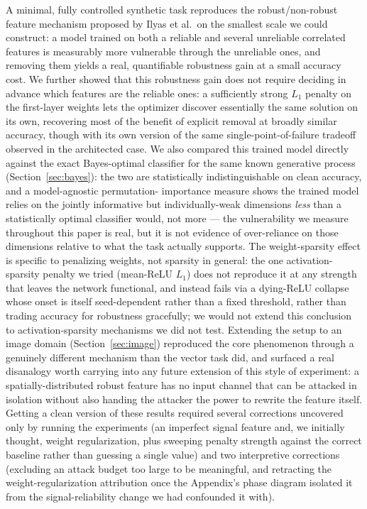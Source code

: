 \documentclass[11pt]{article}
\begin{document}
A minimal, fully controlled synthetic task reproduces the robust/non-robust
feature mechanism proposed by Ilyas et al.\ on the smallest scale we could
construct: a model trained on both a reliable and several unreliable
correlated features is measurably more vulnerable through the unreliable
ones, and removing them yields a real, quantifiable robustness gain at a
small accuracy cost. We further showed that this robustness gain does not
require deciding in advance which features are the reliable ones: a
sufficiently strong $L_1$ penalty on the first-layer weights lets the
optimizer discover essentially the same solution on its own, recovering
most of the benefit of explicit removal at broadly similar accuracy,
though with its own version of the same single-point-of-failure tradeoff
observed in the architected case. We also compared this trained model
directly against the exact Bayes-optimal classifier for the same known
generative process (Section~\ref{sec:bayes}): the two are statistically
indistinguishable on clean accuracy, and a model-agnostic permutation-
importance measure shows the trained model relies on the jointly
informative but individually-weak dimensions \emph{less} than a
statistically optimal classifier would, not more --- the vulnerability we
measure throughout this paper is real, but it is not evidence of
over-reliance on those dimensions relative to what the task actually
supports. The weight-sparsity effect is specific to penalizing weights,
not sparsity in general: the one activation-sparsity penalty we tried
(mean-ReLU $L_1$) does not reproduce it at any strength that leaves the
network functional, and instead fails via a dying-ReLU collapse whose
onset is itself seed-dependent rather than a fixed threshold, rather than
trading accuracy for robustness gracefully; we would not extend this
conclusion to activation-sparsity mechanisms we did not test. Extending
the setup to an
image domain (Section~\ref{sec:image}) reproduced the core phenomenon
through a genuinely different mechanism than the vector task did, and
surfaced a real disanalogy worth carrying into any future extension of
this style of experiment: a spatially-distributed robust feature has no
input channel that can be attacked in isolation without also handing the
attacker the power to rewrite the feature itself. Getting a clean version
of these results required several corrections uncovered only by running
the experiments (an imperfect signal feature and, we initially thought,
weight regularization, plus sweeping penalty strength against the correct
baseline rather than guessing a single value) and two interpretive
corrections (excluding an attack budget too large to be meaningful, and
retracting the weight-regularization attribution once the Appendix's
phase diagram isolated it from the signal-reliability change we had
confounded it with).
\end{document}
